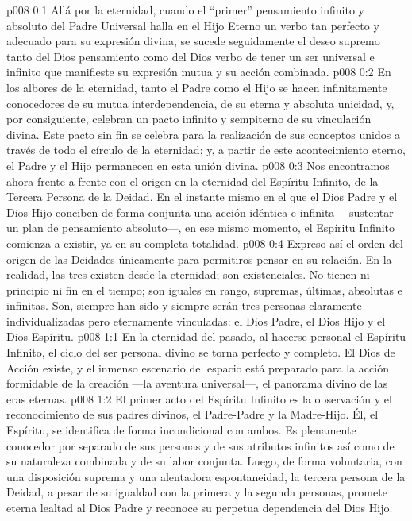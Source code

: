 \author{Consejero divino}
\vs p008 0:1 Allá por la eternidad, cuando el “primer” pensamiento infinito y absoluto del Padre Universal halla en el Hijo Eterno un verbo tan perfecto y adecuado para su expresión divina, se sucede seguidamente el deseo supremo tanto del Dios pensamiento como del Dios verbo de tener un ser universal e infinito que manifieste su expresión mutua y su acción combinada.
\vs p008 0:2 En los albores de la eternidad, tanto el Padre como el Hijo se hacen infinitamente conocedores de su mutua interdependencia, de su eterna y absoluta unicidad, y, por consiguiente, celebran un pacto infinito y sempiterno de su vinculación divina. Este pacto sin fin se celebra para la realización de sus conceptos unidos a través de todo el círculo de la eternidad; y, a partir de este acontecimiento eterno, el Padre y el Hijo permanecen en esta unión divina.
\vs p008 0:3 Nos encontramos ahora frente a frente con el origen en la eternidad del Espíritu Infinito, de la Tercera Persona de la Deidad. En el instante mismo en el que el Dios Padre y el Dios Hijo conciben de forma conjunta una acción idéntica e infinita ---sustentar un plan de pensamiento absoluto---, en ese mismo momento, el Espíritu Infinito comienza a existir, ya en su completa totalidad.
\vs p008 0:4 \pc Expreso así el orden del origen de las Deidades únicamente para permitiros pensar en su relación. En la realidad, las tres existen desde la eternidad; son existenciales. No tienen ni principio ni fin en el tiempo; son iguales en rango, supremas, últimas, absolutas e infinitas. Son, siempre han sido y siempre serán tres personas claramente individualizadas pero eternamente vinculadas: el Dios Padre, el Dios Hijo y el Dios Espíritu.
\vs p008 1:1 En la eternidad del pasado, al hacerse personal el Espíritu Infinito, el ciclo del ser personal divino se torna perfecto y completo. El Dios de Acción existe, y el inmenso escenario del espacio está preparado para la acción formidable de la creación ---la aventura universal---, el panorama divino de las eras eternas.
\vs p008 1:2 El primer acto del Espíritu Infinito es la observación y el reconocimiento de sus padres divinos, el Padre\hyp{}Padre y la Madre\hyp{}Hijo. Él, el Espíritu, se identifica de forma incondicional con ambos. Es plenamente conocedor por separado de sus personas y de sus atributos infinitos así como de su naturaleza combinada y de su labor conjunta. Luego, de forma voluntaria, con una disposición suprema y una alentadora espontaneidad, la tercera persona de la Deidad, a pesar de su igualdad con la primera y la segunda personas, promete eterna lealtad al Dios Padre y reconoce su perpetua dependencia del Dios Hijo.
